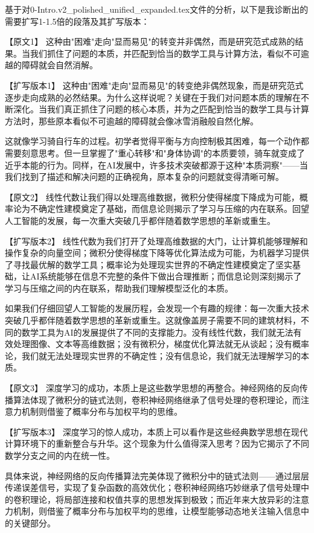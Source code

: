 基于对0-Intro.v2_polished_unified_expanded.tex文件的分析，以下是我诊断出的需要扩写1-1.5倍的段落及其扩写版本：

【原文1】
这种由"困难"走向"显而易见"的转变并非偶然，而是研究范式成熟的结果。当我们抓住了问题的本质，并匹配到恰当的数学工具与计算方法，看似不可逾越的障碍就会自然消解。

【扩写版本1】
这种由"困难"走向"显而易见"的转变绝非偶然现象，而是研究范式逐步走向成熟的必然结果。为什么这样说呢？关键在于我们对问题本质的理解在不断深化。当我们真正抓住了问题的核心本质，并为之匹配到恰当的数学工具与计算方法时，那些原本看似不可逾越的障碍就会像冰雪消融般自然化解。

这就像学习骑自行车的过程。初学者觉得平衡与方向控制极其困难，每一个动作都需要刻意思考。但一旦掌握了"重心转移"和"身体协调"的本质要领，骑车就变成了近乎本能的行为。同样，在AI发展中，许多技术突破都源于这种"本质洞察"——当我们找到了描述和解决问题的正确视角，原本复杂的问题就变得清晰可解。

【原文2】
线性代数让我们得以处理高维数据，微积分使得梯度下降成为可能，概率论为不确定性建模奠定了基础，而信息论则揭示了学习与压缩的内在联系。回望人工智能的发展，每一次重大突破几乎都伴随着数学思想的革新或重生。

【扩写版本2】
线性代数为我们打开了处理高维数据的大门，让计算机能够理解和操作复杂的向量空间；微积分使得梯度下降等优化算法成为可能，为机器学习提供了寻找最优解的数学工具；概率论为处理现实世界的不确定性建模奠定了坚实基础，让AI系统能够在信息不完整的条件下做出合理推断；而信息论则深刻揭示了学习与压缩之间的内在联系，帮助我们理解模型泛化的本质。

如果我们仔细回望人工智能的发展历程，会发现一个有趣的规律：每一次重大技术突破几乎都伴随着数学思想的革新或重生。这就像盖房子需要不同的建筑材料，不同的数学工具为AI的发展提供了不同的支撑能力。没有线性代数，我们就无法有效处理图像、文本等高维数据；没有微积分，梯度优化算法就无从谈起；没有概率论，我们就无法处理现实世界的不确定性；没有信息论，我们就无法理解学习的本质。

【原文3】
深度学习的成功，本质上是这些数学思想的再整合。神经网络的反向传播算法体现了微积分的链式法则，卷积神经网络继承了信号处理的卷积理论，而注意力机制则借鉴了概率分布与加权平均的思维。

【扩写版本3】
深度学习的惊人成功，本质上可以看作是这些经典数学思想在现代计算环境下的重新整合与升华。这个现象为什么值得深入思考？因为它揭示了不同数学分支之间的内在统一性。

具体来说，神经网络的反向传播算法完美体现了微积分中的链式法则——通过层层传递误差信号，实现了复杂函数的高效优化；卷积神经网络巧妙继承了信号处理中的卷积理论，将局部连接和权值共享的思想发挥到极致；而近年来大放异彩的注意力机制，则借鉴了概率分布与加权平均的思维，让模型能够动态地关注输入信息中的关键部分。

